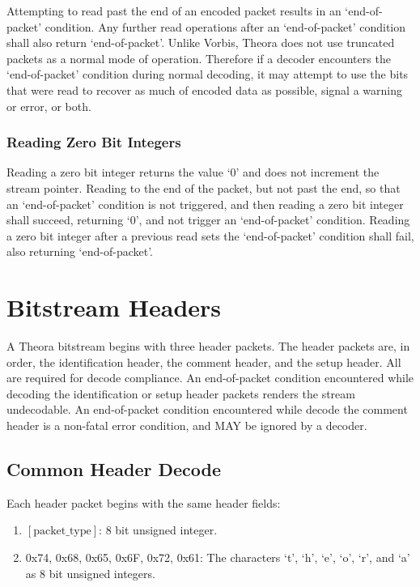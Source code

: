 \documentclass[11pt,letterpaper]{article}
\newcommand{\bitvar}[1]{\ensuremath{\left[\mathrm{#1}\right]}}
\begin{document}
Attempting to read past the end of an encoded packet results in an
 `end-of-packet' condition.
Any further read operations after an `end-of-packet' condition shall also
 return `end-of-packet'.
Unlike Vorbis, Theora does not use truncated packets as a normal mode of
 operation.
Therefore if a decoder encounters the `end-of-packet' condition during normal
 decoding, it may attempt to use the bits that were read to recover as much of
 encoded data as possible, signal a warning or error, or both.

\subsubsection{Reading Zero Bit Integers}

Reading a zero bit integer returns the value `$0$' and does not increment
 the stream pointer.
Reading to the end of the packet, but not past the end, so that an
 `end-of-packet' condition is not triggered, and then reading a zero bit
 integer shall succeed, returning `$0$', and not trigger an `end-of-packet'
 condition.
Reading a zero bit integer after a previous read sets the `end-of-packet'
 condition shall fail, also returning `end-of-packet'.

\section{Bitstream Headers}
\label{sec:headers}

A Theora bitstream begins with three header packets.
The header packets are, in order, the identification header, the comment
 header, and the setup header.
All are required for decode compliance.
An end-of-packet condition encountered while decoding the identification or
 setup header packets renders the stream undecodable.
An end-of-packet condition encountered while decode the comment header is a
 non-fatal error condition, and MAY be ignored by a decoder.

\subsection{Common Header Decode}

Each header packet begins with the same header fields:

\begin{enumerate}
\item{\bitvar{packet\_type}:} 8 bit unsigned integer.
\item{0x74, 0x68, 0x65, 0x6F, 0x72, 0x61:}
The characters `t', `h', `e', `o', `r', and `a' as 8 bit unsigned integers.
\end{enumerate}
\end{document}

